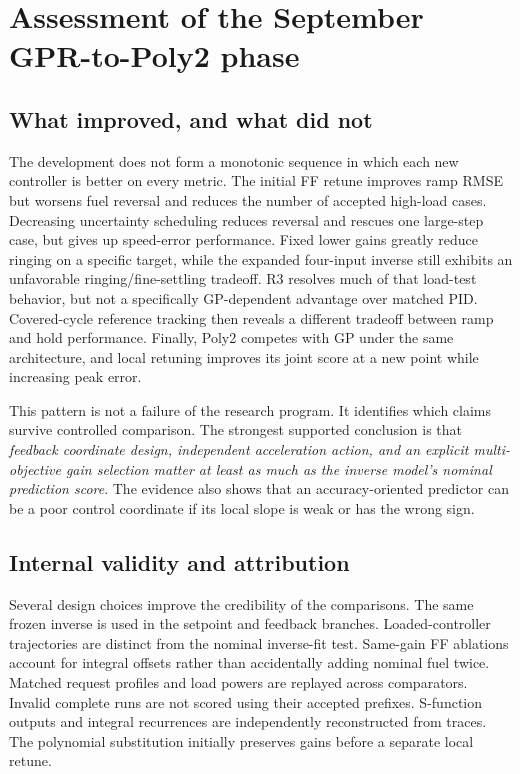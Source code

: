 \chapter{Assessment of the September GPR-to-Poly2 phase}
\section{What improved, and what did not}
The development does not form a monotonic sequence in which each new controller is better on every metric. The initial FF retune improves ramp RMSE but worsens fuel reversal and reduces the number of accepted high-load cases. Decreasing uncertainty scheduling reduces reversal and rescues one large-step case, but gives up speed-error performance. Fixed lower gains greatly reduce ringing on a specific target, while the expanded four-input inverse still exhibits an unfavorable ringing/fine-settling tradeoff. R3 resolves much of that load-test behavior, but not a specifically GP-dependent advantage over matched PID. Covered-cycle reference tracking then reveals a different tradeoff between ramp and hold performance. Finally, Poly2 competes with GP under the same architecture, and local retuning improves its joint score at a new point while increasing peak error.

This pattern is not a failure of the research program. It identifies which claims survive controlled comparison. The strongest supported conclusion is that \emph{feedback coordinate design, independent acceleration action, and an explicit multi-objective gain selection matter at least as much as the inverse model's nominal prediction score}. The evidence also shows that an accuracy-oriented predictor can be a poor control coordinate if its local slope is weak or has the wrong sign.

\section{Internal validity and attribution}
Several design choices improve the credibility of the comparisons. The same frozen inverse is used in the setpoint and feedback branches. Loaded-controller trajectories are distinct from the nominal inverse-fit test. Same-gain FF ablations account for integral offsets rather than accidentally adding nominal fuel twice. Matched request profiles and load powers are replayed across comparators. Invalid complete runs are not scored using their accepted prefixes. S-function outputs and integral recurrences are independently reconstructed from traces. The polynomial substitution initially preserves gains before a separate local retune.

